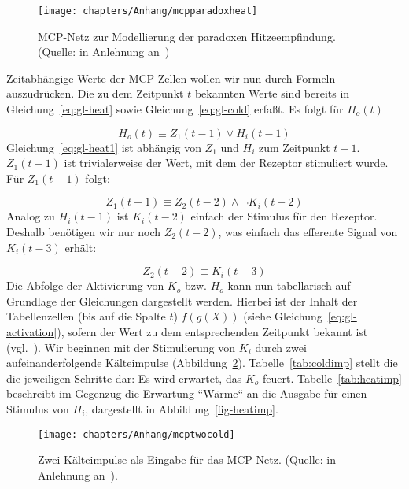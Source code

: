 \begin{figure}[h]
    \centering
    \texttt{[image: chapters/Anhang/mcpparadoxheat]}
    \caption{MCP-Netz zur Modellierung der paradoxen Hitzeempfindung. (Quelle: in Anlehnung an~\cite[31, Figure 1.18]{Fau94})}
    \label{fig-mcpheat}
\end{figure}


\noindent
Zeitabhängige Werte der MCP-Zellen wollen wir nun durch Formeln auszudrücken.
Die zu dem Zeitpunkt $t$ bekannten Werte sind bereits in Gleichung~\ref{eq:gl-heat} sowie Gleichung~\ref{eq:gl-cold} erfaßt.
\noindent
Es folgt für $H_o(t)$

\begin{equation}
    H_o(t) \equiv Z_1(t-1) \lor H_i(t-1)
    \label{eq:gl-heat1}
\end{equation}
\noindent
Gleichung~\ref{eq:gl-heat1} ist abhängig von $Z_1$ und $H_i$ zum Zeitpunkt $t - 1$. $Z_1(t-1)$ ist trivialerweise der Wert, mit dem der Rezeptor stimuliert wurde. Für $Z_1(t-1)$ folgt:

\begin{equation}
    Z_1(t - 1) \equiv Z_2(t-2) \land \neg K_i(t-2)
    \label{eq:gl-z1}
\end{equation}
\noindent
Analog zu $H_i(t - 1)$ ist $K_i(t - 2)$ einfach der Stimulus für den Rezeptor.
Deshalb benötigen wir nur noch $Z_2(t-2)$, was einfach das efferente Signal von $K_i(t-3)$ erhält:

\begin{equation}
    Z_2(t-2) \equiv K_i(t-3)
    \label{eq:gl-z2}
\end{equation}
\noindent
Die Abfolge der Aktivierung von $K_o$ bzw. $H_o$ kann nun tabellarisch auf Grundlage der Gleichungen dargestellt werden.
Hierbei ist der Inhalt der Tabellenzellen (bis auf die Spalte $t$) $f(g(X))$  (siehe Gleichung~\ref{eq:gl-activation}), sofern der Wert zu dem entsprechenden Zeitpunkt bekannt ist (vgl.~\cite[32 f.]{Fau94}).
\noindent
Wir beginnen mit der Stimulierung von $K_i$ durch zwei aufeinanderfolgende Kälteimpulse (Abbildung~\ref{fig-coldimp}). Tabelle~\ref{tab:coldimp} stellt die die jeweiligen Schritte dar: Es wird erwartet, das $K_o$ feuert. Tabelle~\ref{tab:heatimp} beschreibt im Gegenzug die Erwartung ``Wärme`` an die Ausgabe für einen Stimulus von $H_i$, dargestellt in Abbildung~\ref{fig-heatimp}.

\begin{figure}[h]
    \begin{center}
    \texttt{[image: chapters/Anhang/mcptwocold]}
    \caption{Zwei Kälteimpulse als Eingabe für das MCP-Netz. (Quelle: in Anlehnung an~\cite[35, Figure 1.23]{Fau94}).}
    \end{center}
    \label{fig-coldimp}
\end{figure}





